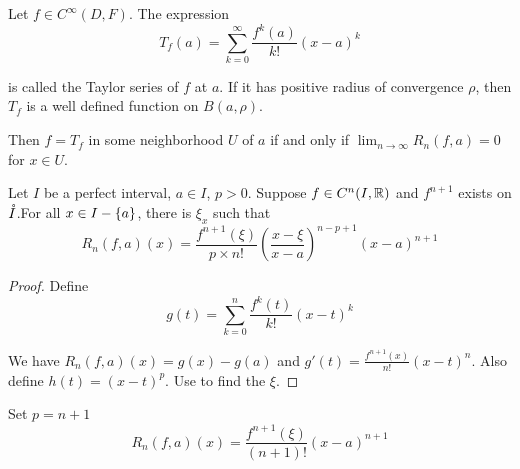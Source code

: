 \begin{definition}
    Let $f \in C^\infty (D, F)$. The expression
    \begin{equation}
        T_f (a) = \sum_{k=0}^\infty \frac{f^k(a)}{k!}(x-a)^k
    \end{equation}
    
    is called the Taylor series of $f$ at $a$. If it has positive radius of convergence $\rho$, then $T_f$ is a well defined function on $B(a,\rho)$. 
    
    Then $f = T_f$ in some neighborhood $U$ of $a$ if and only if $\displaystyle \lim_{n \rightarrow \infty} R_n(f,a) = 0$ for $x \in U$.
\end{definition}

\begin{theorem}
    Let $I$ be a perfect interval, $a \in I$, $p > 0$. Suppose $f \in C^n(I, \mathbb{R})$ and $f^{n+1}$ exists on $\mathring{I}$.For all $x \in I - \set{a}$, there is $\xi_x$ such that
    \begin{equation}
        R_n(f,a)(x) = \frac{f^{n+1}(\xi)}{p \times n!}\left( \frac{x-\xi}{x-a} \right)^{n-p+1} (x-a)^{n+1}
    \end{equation}
\end{theorem}
\begin{proof}
    Define
    \begin{equation}
        g(t) = \sum_{k=0}^n \frac{f^k (t)}{k!}(x-t)^k
    \end{equation}
    
    We have $R_n (f,a)(x) = g(x) - g(a)$ and $g'(t) = \frac{f^{n+1}(x)}{n!}(x-t)^n$. Also define $h(t) = (x-t)^p$. Use  to find the $\xi$.
\end{proof}

\begin{theorem}
    Set $p = n+1$
    \begin{equation}
        R_n (f,a)(x) = \frac{f^{n+1}(\xi)}{(n+1)!}(x-a)^{n+1}
    \end{equation}
\end{theorem}

